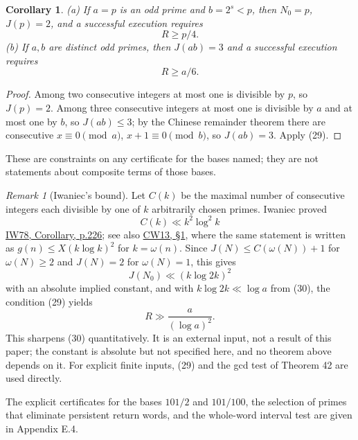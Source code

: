 \documentclass[11pt,reqno]{amsart}
\newtheorem{corollary}[theorem]{Corollary}
\theoremstyle{definition}
\theoremstyle{remark}
\newtheorem*{remark}{Remark}
\begin{document}
\begin{samepage}
\begin{corollary}\leavevmode\label{thm:45}
(a) If \(a=p\) is an odd prime and \(b=2^s<p\), then
\(N_0=p\), \(J(p)=2\), and a successful execution requires
\[
R\ge p/4.
\]
(b) If \(a,b\) are distinct odd primes, then \(J(ab)=3\)
and a successful execution requires
\[
R\ge a/6.
\]
\label{thm-end:45}
\end{corollary}
\end{samepage}

\begin{proof}\leavevmode\label{proof:45}
Among two consecutive integers at most one is divisible by
\(p\), so \(J(p)=2\). Among three consecutive integers at most one is
divisible by \(a\) and at most one by \(b\), so \(J(ab)\le3\); by the
Chinese remainder theorem there are consecutive \(x\equiv0\pmod a\),
\(x+1\equiv0\pmod b\), so \(J(ab)=3\). Apply (29). \qedhere
\end{proof}

These are constraints on any certificate for the bases named; they are
not statements about composite terms of those bases.

\begin{remark}[Iwaniec’s bound]
Let \(C(k)\) be the maximal number of
consecutive integers each divisible by one of \(k\) arbitrarily chosen
primes. Iwaniec proved
\[
C(k)\ll k^2\log^2k
\]
\hyperref[ref-iw78]{IW78, Corollary, p.226}; see also
\hyperref[ref-cw13]{CW13, §1}, where the same statement is written as
\(g(n)\le X(k\log k)^2\) for \(k=\omega(n)\). Since
\(J(N)\le C(\omega(N))+1\) for \(\omega(N)\ge2\) and \(J(N)=2\) for
\(\omega(N)=1\), this gives
\[
J(N_0)\ll(k\log2k)^2
\]
with an absolute
implied constant, and with \(k\log2k\ll\log a\) from (30), the
condition (29) yields
\[
R\gg\frac{a}{(\log a)^2}.
\]
This sharpens (30) quantitatively. It is an external input, not a result
of this paper; the constant is absolute but not specified here, and no
theorem above depends on it. For explicit finite inputs, (29) and the
gcd test of Theorem 42 are used directly.
\end{remark}

The explicit certificates for the bases \(101/2\) and \(101/100\), the
selection of primes that eliminate persistent return words, and the
whole-word interval test are given in Appendix E.4.
\end{document}
